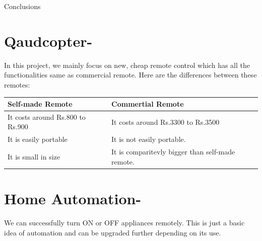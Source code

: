 \documentclass[12pt, oneside]{report}
\numberwithin{equation}{section}
\begin{document}
\begin{chapter}{Conclusions}
\section{Qaudcopter-}

In this project, we mainly focus on new, cheap remote control which has all the functionalities same as commercial remote. Here are the differences between these remotes:\\

\begin{tabu} to \textwidth { | X[c] | X[c] | }
 \hline
 \textbf{Self-made Remote} & \textbf{Commertial Remote} \\
 \hline
 It costs around Rs.800 to Rs.900   & It costs around Rs.3300 to Rs.3500  \\
\hline
 It is easily portable & It is not easily portable.  \\
\hline
 It is small in size & It is comparitevly bigger than self-made remote.  \\
\hline
\end{tabu}



\section{Home Automation-}
We can successfully turn ON or OFF appliances remotely. This is just a basic idea of automation and can be upgraded further depending on its use.

\end{chapter}
\end{document}

